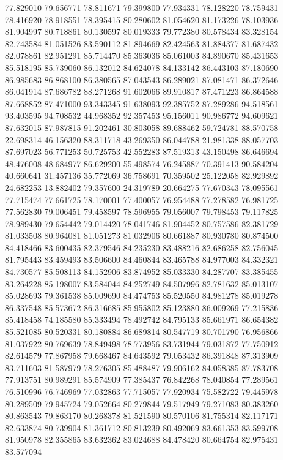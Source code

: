 77.829010
79.656771
78.811671
79.399800
77.934331
78.128220
78.759431
78.416920
78.918551
78.395415
80.280602
81.054620
81.173226
78.103936
81.904997
80.718861
80.130597
80.019333
79.772380
80.578434
83.328154
82.743584
81.051526
83.590112
81.894669
82.424563
81.884377
81.687432
82.078861
82.951291
85.714470
85.363036
85.061003
84.890670
85.431653
85.518195
85.739060
86.132012
84.624078
84.133142
86.443103
87.180690
86.985683
86.868100
86.380565
87.043543
86.289021
87.081471
86.372646
86.041914
87.686782
88.271268
91.602066
89.910817
87.471223
86.864588
87.668852
87.471000
93.343345
91.638093
92.385752
87.289286
94.518561
93.403595
94.708532
44.968352
92.357453
95.156011
90.986772
94.609621
87.632015
87.987815
91.202461
30.803058
89.688462
59.724781
88.570758
22.698314
46.156320
88.311718
43.269350
86.044788
21.981338
88.057703
87.697023
56.771253
50.725753
42.552283
87.519313
43.150498
86.646694
48.476008
48.684977
86.629200
55.498574
76.245887
70.391413
90.584204
40.660641
31.457136
35.772069
36.758691
70.359502
25.122058
82.929892
24.682253
13.882402
79.357600
24.319789
20.664275
77.670343
78.095561
77.715474
77.661725
78.170001
77.400057
76.954488
77.278582
76.981725
77.562830
79.006451
79.458597
78.596955
79.056007
79.798453
79.117825
78.989430
79.654442
79.014420
78.041746
81.904452
80.757586
82.381729
81.033508
80.964081
81.051273
81.032906
80.661887
80.930780
80.874500
84.418466
83.600435
82.379546
84.235230
83.488216
82.686258
82.756045
81.795443
83.459493
83.506600
84.460844
83.465788
84.977003
84.332321
84.730577
85.508113
84.152906
83.874952
85.033330
84.287707
83.385455
83.264228
85.198007
83.584044
84.252749
84.507996
82.781632
85.013107
85.028693
79.361538
85.009690
84.474753
85.520550
84.981278
85.019278
86.337548
85.573672
86.316685
85.955802
85.123880
86.009269
77.215836
85.418458
74.185580
85.333494
78.492742
84.795133
85.661971
86.654382
85.521085
80.520331
80.180884
86.689814
80.547719
80.701790
76.956866
81.037922
80.769639
78.849498
78.773956
83.731944
79.031872
77.750912
82.614579
77.867958
79.668467
84.643592
79.053432
86.391848
87.313909
83.711603
81.587979
78.276305
85.488487
79.906162
84.058385
87.783708
77.913751
80.989291
85.574909
77.385437
76.842268
78.040854
77.289561
76.510996
76.746969
77.032863
77.715057
77.920934
75.582722
79.445978
80.289509
79.945724
79.052664
80.279844
79.517949
79.271083
80.383260
80.863543
79.863170
80.268378
81.521590
80.570106
81.755314
82.117171
82.633874
80.739904
81.361712
80.813239
80.492069
83.661353
83.599708
81.950978
82.355865
83.632362
83.024688
84.478420
80.664754
82.975431
83.577094
